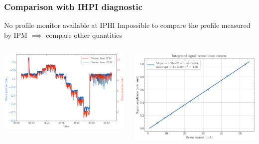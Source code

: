 \begin{frame}
  \frametitle{Comparison with IHPI diagnostic}
  \begin{alertblock}{No profile monitor available at IPHI}
    Impossible to compare the profile measured by IPM $\implies$ compare other quantities
  \end{alertblock}
  \begin{columns}[T]
    \begin{column}{0.45\textwidth}
      \includegraphics[width=1.14\textwidth]{04_Test/fig/fig000_beam_car_a}
    \end{column}
    \begin{column}{0.45\textwidth}
      \includegraphics[width=1\textwidth]{04_Test/fig/fig000_current_sweep_a}
    \end{column}
  \end{columns}
  \begin{columns}[T]

\end{columns}
\end{frame}
